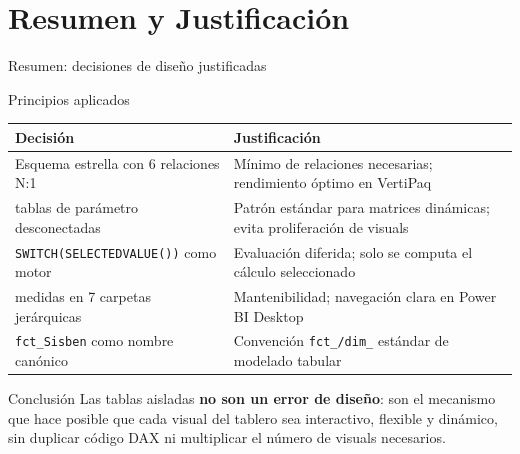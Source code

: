 \documentclass[aspectratio=169, 10pt]{beamer}
\begin{document}
\section{Resumen y Justificaci\'on}

\begin{frame}{Resumen: decisiones de dise\~no justificadas}

\begin{block}{Principios aplicados}
\begin{tabular}{p{5.5cm} p{6cm}}
\toprule
\textbf{Decisi\'on} & \textbf{Justificaci\'on} \\
\midrule
Esquema estrella con 6 relaciones N:1 & M\'inimo de relaciones necesarias; rendimiento \'optimo en VertiPaq \\
\addlinespace
10 tablas de par\'ametro desconectadas & Patr\'on est\'andar para matrices din\'amicas; evita proliferaci\'on de visuals \\
\addlinespace
\texttt{SWITCH(SELECTEDVALUE())} como motor & Evaluaci\'on diferida; solo se computa el c\'alculo seleccionado \\
\addlinespace
203 medidas en 7 carpetas jer\'arquicas & Mantenibilidad; navegaci\'on clara en Power BI Desktop \\
\addlinespace
\texttt{fct\_Sisben} como nombre can\'onico & Convenci\'on \texttt{fct\_/dim\_} est\'andar de modelado tabular \\
\bottomrule
\end{tabular}
\end{block}

\begin{exampleblock}{Conclusi\'on}
Las tablas aisladas \textbf{no son un error de dise\~no}: son el mecanismo que hace posible que cada visual del tablero sea interactivo, flexible y din\'amico, sin duplicar c\'odigo DAX ni multiplicar el n\'umero de visuals necesarios.
\end{exampleblock}
\end{frame}
\end{document}

